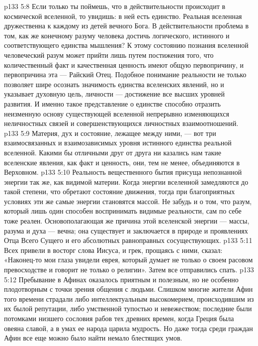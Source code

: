 \vs p133 5:8 Если только ты поймешь, что в действительности происходит в космической вселенной, то увидишь: в ней есть единство. Реальная вселенная дружественна к каждому из детей вечного Бога. В действительности проблема в том, как же конечному разуму человека достичь логического, истинного и соответствующего единства мышления? К этому состоянию познания вселенной человеческий разум может прийти лишь путем постижения того, что количественный факт и качественная ценность имеют общую первопричину, и первопричина эта --- Райский Отец. Подобное понимание реальности не только позволяет шире осознать значимость единства вселенских явлений, но и указывает духовную цель, личности --- достижение все высших уровней развития. И именно такое представление о единстве способно отразить неизменную основу существующей вселенной непрерывно изменяющихся неличностных связей и совершенствующихся личностных взаимоотношений.
\vs p133 5:9 Материя, дух и состояние, лежащее между ними, --- вот три взаимосвязанных и взаимозависимых уровня истинного единства реальной вселенной. Какими бы отличными друг от друга ни казались нам такие вселенские явления, как факт и ценность, они, тем не менее, объединяются в Верховном.
\vs p133 5:10 Реальность вещественного бытия присуща непознанной энергии так же, как видимой материи. Когда энергии вселенной замедляются до такой степени, что обретают состояние движения, тогда при благоприятных условиях эти же самые энергии становятся массой. Не забудь и о том, что разум, который лишь один способен воспринимать видимые реальности, сам по себе тоже реален. Основополагающая же причина этой вселенской энергии --- массы, разума и духа --- вечна; она существует и заключается в природе и проявлениях Отца Всего Сущего и его абсолютных равноправных сосуществующих.
\vs p133 5:11 \pc Всех привели в восторг слова Иисуса, и грек, прощаясь с ними, сказал: «Наконец\hyp{}то мои глаза увидели еврея, который думает не только о своем расовом превосходстве и говорит не только о религии». Затем все отправились спать.
\vs p133 5:12 Пребывание в Афинах оказалось приятным и полезным, но не особенно плодотворным с точки зрения общения с людьми. Слишком многие жители Афин того времени страдали либо интеллектуальным высокомерием, происходившим из их былой репутации, либо умственной тупостью и невежеством; последние были потомками низшего сословия рабов тех древних времен, когда Греция была овеяна славой, а в умах ее народа царила мудрость. Но даже тогда среди граждан Афин все еще можно было найти немало блестящих умов.
